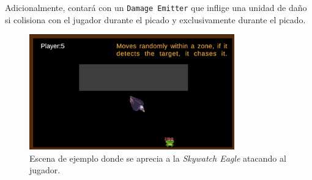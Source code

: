 Adicionalmente, contará con un \texttt{Damage Emitter} que inflige una unidad de daño si colisiona con el jugador durante el picado y exclusivamente durante el picado.
\begin{figure}[t]
	\centering
	\includegraphics[height=5cm]{Imagenes/AguilaCayendo.png}
	\caption{Escena de ejemplo donde se aprecia a la \textit{Skywatch Eagle} atacando al jugador.}
	\label{fig:SkywatchEagle}
\end{figure}


